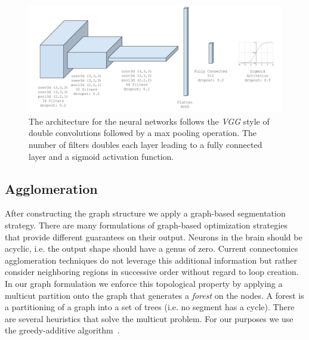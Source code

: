 \begin{figure}[t]
	\centering
	\includegraphics[width=0.95\linewidth]{figures/architecture.png}
	\caption{The architecture for the neural networks follows the \textit{VGG} style of double convolutions followed by a max pooling operation. The number of filters doubles each layer leading to a fully connected layer and a sigmoid activation function.}
	\label{fig:architecture}
\end{figure}

\subsection{Agglomeration}

After constructing the graph structure we apply a graph-based segmentation strategy. 
There are many formulations of graph-based optimization strategies that provide different guarantees on their output. 
Neurons in the brain should be acyclic, i.e. the output shape should have a genus of zero. 
Current connectomics agglomeration techniques do not leverage this additional information but rather consider neighboring regions in successive order without regard to loop creation. 
In our graph formulation we enforce this topological property by applying a multicut partition onto the graph that generates a \textit{forest} on the nodes. 
A forest is a partitioning of a graph into a set of trees (i.e. no segment has a cycle). 
There are several heuristics that solve the multicut problem. For our purposes we use the greedy-additive algorithm~\cite{keuper2015efficient}.